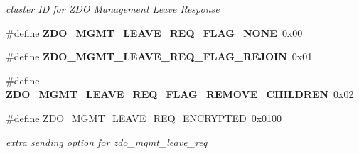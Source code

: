 \begin{DoxyCompactItemize}
\begin{DoxyCompactList}\small\item\em cluster I\-D for Z\-D\-O Management Leave Response \end{DoxyCompactList}\item 
\hypertarget{group__zdo_gad38af5fd79833ce21fc6db74a0da2d59}{\#define {\bfseries Z\-D\-O\-\_\-\-M\-G\-M\-T\-\_\-\-L\-E\-A\-V\-E\-\_\-\-R\-E\-Q\-\_\-\-F\-L\-A\-G\-\_\-\-N\-O\-N\-E}~0x00}\label{group__zdo_gad38af5fd79833ce21fc6db74a0da2d59}

\item 
\hypertarget{group__zdo_ga8b8f314709a24ba19b4b802000800c18}{\#define {\bfseries Z\-D\-O\-\_\-\-M\-G\-M\-T\-\_\-\-L\-E\-A\-V\-E\-\_\-\-R\-E\-Q\-\_\-\-F\-L\-A\-G\-\_\-\-R\-E\-J\-O\-I\-N}~0x01}\label{group__zdo_ga8b8f314709a24ba19b4b802000800c18}

\item 
\hypertarget{group__zdo_ga6abdd6bd391973f4fa19747ee6c18a86}{\#define {\bfseries Z\-D\-O\-\_\-\-M\-G\-M\-T\-\_\-\-L\-E\-A\-V\-E\-\_\-\-R\-E\-Q\-\_\-\-F\-L\-A\-G\-\_\-\-R\-E\-M\-O\-V\-E\-\_\-\-C\-H\-I\-L\-D\-R\-E\-N}~0x02}\label{group__zdo_ga6abdd6bd391973f4fa19747ee6c18a86}

\item 
\hypertarget{group__zdo_ga2941a931686d22927d9e6a7ad7472737}{\#define \hyperlink{group__zdo_ga2941a931686d22927d9e6a7ad7472737}{Z\-D\-O\-\_\-\-M\-G\-M\-T\-\_\-\-L\-E\-A\-V\-E\-\_\-\-R\-E\-Q\-\_\-\-E\-N\-C\-R\-Y\-P\-T\-E\-D}~0x0100}\label{group__zdo_ga2941a931686d22927d9e6a7ad7472737}

\begin{DoxyCompactList}\small\item\em extra sending option for zdo\-\_\-mgmt\-\_\-leave\-\_\-req \end{DoxyCompactList}\end{DoxyCompactItemize}
